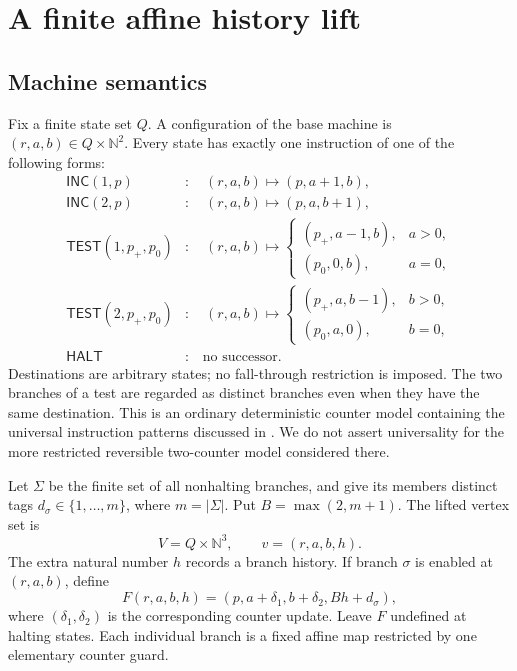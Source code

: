 \documentclass[11pt,letterpaper]{article}
\theoremstyle{definition}
\theoremstyle{remark}
\newcommand{\N}{\mathbb N}
\newcommand{\INC}{\mathsf{INC}}
\newcommand{\TEST}{\mathsf{TEST}}
\newcommand{\HALT}{\mathsf{HALT}}
\begin{document}
\section{A finite affine history lift}\label{ste:cg:sec:history}
\subsection{Machine semantics}
Fix a finite state set $Q$. A configuration of the base machine is
$(r,a,b)\in Q\times\N^2$. Every state has exactly one instruction of one of
the following forms:
\begin{align*}
\INC(1,p)&:\quad (r,a,b)\longmapsto(p,a+1,b),\\
\INC(2,p)&:\quad (r,a,b)\longmapsto(p,a,b+1),\\
\TEST(1,p_+,p_0)&:\quad
(r,a,b)\longmapsto
\begin{cases}(p_+,a-1,b),&a>0,\\(p_0,0,b),&a=0,
\end{cases}\\
\TEST(2,p_+,p_0)&:\quad
(r,a,b)\longmapsto
\begin{cases}(p_+,a,b-1),&b>0,\\(p_0,a,0),&b=0,
\end{cases}\\
\HALT&:\quad\text{no successor.}
\end{align*}
Destinations are arbitrary states; no fall-through restriction is imposed.
The two branches of a test are regarded as distinct branches even when they
have the same destination. This is an ordinary deterministic counter
model containing the universal instruction patterns discussed in
\cite{dudenhefner}. We do not assert universality for the more restricted
reversible two-counter model considered there.

Let $\Sigma$ be the finite set of all nonhalting branches, and give its
members distinct tags $d_\sigma\in\{1,\ldots,m\}$, where $m=|\Sigma|$.
Put $B=\max(2,m+1)$. The lifted vertex set is
\begin{equation}\label{ste:cg:eq:vertices}
 V=Q\times\N^3,
 \qquad v=(r,a,b,h).
\end{equation}
The extra natural number $h$ records a branch history. If branch $\sigma$
is enabled at $(r,a,b)$, define
\begin{equation}\label{ste:cg:eq:lift}
 F(r,a,b,h)=(p,a+\delta_1,b+\delta_2,Bh+d_\sigma),
\end{equation}
where $(\delta_1,\delta_2)$ is the corresponding counter update. Leave
$F$ undefined at halting states. Each individual branch is a fixed affine
map restricted by one elementary counter guard.
\end{document}
